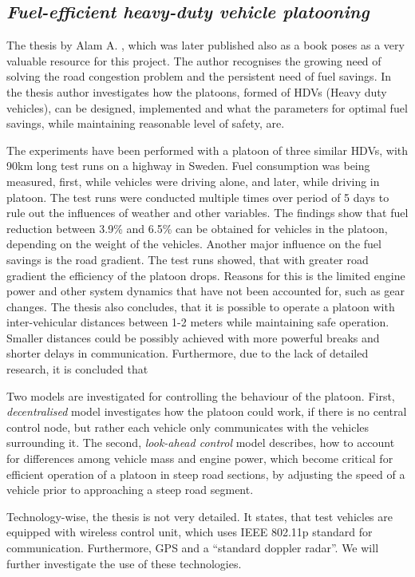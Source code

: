 
\subsection{\textit{Fuel-efficient heavy-duty vehicle platooning}}
The thesis by Alam A. \cite{Alam2014Fuel-efficientPlatooning}, which was later published also as a book poses as a very valuable resource for this project. The author recognises the growing need of solving the road congestion problem and the persistent need of fuel savings. In the thesis author investigates how the platoons, formed of \acrshort{HDV}s (Heavy duty vehicles), can be designed, implemented and what the parameters for optimal fuel savings, while maintaining reasonable level of safety, are.\par
% 
% 
The experiments have been performed with a platoon of three similar \acrshort{HDV}s, with 90km long test runs on a highway in Sweden. Fuel consumption was being measured, first, while vehicles were driving alone, and later, while driving in platoon. The test runs were conducted multiple times over period of 5 days to rule out the influences of weather and other variables. The findings show that fuel reduction between 3.9\% and 6.5\% can be obtained for vehicles in the platoon, depending on the weight of the vehicles. Another major influence on the fuel savings is the road gradient. The test runs showed, that with greater road gradient the efficiency of the platoon drops. Reasons for this is the limited engine power and other system dynamics that have not been accounted for, such as gear changes. The thesis also concludes, that it is possible to operate a platoon with inter-vehicular distances between 1-2 meters while maintaining safe operation. Smaller distances could be possibly achieved with more powerful breaks and shorter delays in communication. Furthermore, due to the lack of detailed research, it is concluded that 
\par
% 
Two models are investigated for controlling the behaviour of the platoon. First, \emph{decentralised} model investigates how the platoon could work, if there is no central control node, but rather each vehicle only communicates with the vehicles surrounding it. The second, \emph{look-ahead control} model describes, how to account for differences among vehicle mass and engine power, which become critical for efficient operation of a platoon in steep road sections, by adjusting the speed of a vehicle prior to approaching a steep road segment.
\par
% 
Technology-wise, the thesis is not very detailed. It states, that test vehicles are equipped with wireless control unit, which uses \acrshort{IEEE} 802.11p standard for communication. Furthermore, \acrshort{GPS} and a \enquote{standard doppler radar}. We will further investigate the use of these technologies.
% 
